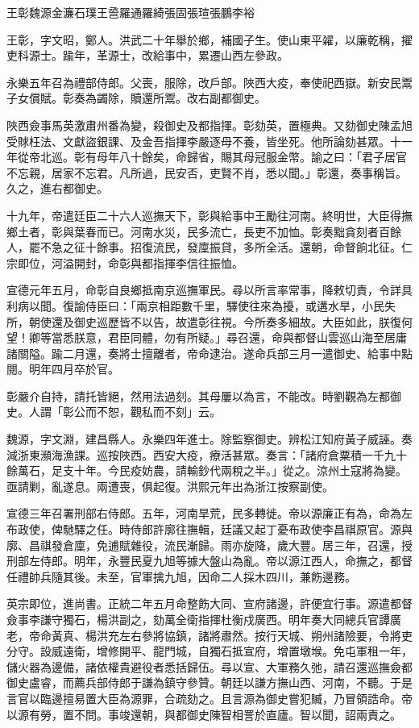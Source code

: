 
\begin{pinyinscope}
王彰魏源金濂石璞王巹羅通羅綺張固張瑄張鵬李裕

王彰，字文昭，鄭人。洪武二十年舉於鄉，補國子生。使山東平糴，以廉乾稱，擢吏科源士。踰年，革源士，改給事中，累遷山西左參政。

永樂五年召為禮部侍郎。父喪，服除，改戶部。陜西大疫，奉使祀西嶽。新安民鬻子女償賦。彰奏為蠲除，贖還所鬻。改右副都御史。

陜西僉事馬英激肅州番為變，殺御史及都指揮。彰劾英，置極典。又劾御史陳孟旭受賕枉法、文獻盜銀課、及金吾指揮李嚴逐母不養，皆坐死。他所論劾甚眾。十一年從帝北巡。彰有母年八十餘矣，命歸省，賜其母冠服金幣。諭之曰：「君子居官不忘親，居家不忘君。凡所過，民安否，吏賢不肖，悉以聞。」彰還，奏事稱旨。久之，進右都御史。

十九年，帝遣廷臣二十六人巡撫天下，彰與給事中王勵往河南。終明世，大臣得撫鄉土者，彰與葉春而已。河南水災，民多流亡，長吏不加恤。彰奏黜貪刻者百餘人，罷不急之征十餘事。招復流民，發廩振貸，多所全活。還朝，命督餉北征。仁宗即位，河溢開封，命彰與都指揮李信往振恤。

宣德元年五月，命彰自良鄉抵南京巡撫軍民。尋以所言率常事，降敕切責，令詳具利病以聞。復諭侍臣曰：「兩京相距數千里，驛使往來為擾，或遘水旱，小民失所，朝使還及御史巡歷皆不以告，故遣彰往視。今所奏多細故。大臣如此，朕復何望！卿等當悉朕意，君臣同體，勿有所疑。」尋召還，命與都督山雲巡山海至居庸諸關隘。踰二月還，奏將士擅離者，帝命逮治。遂命兵部三月一遣御史、給事中點閱。明年四月卒於官。

彰嚴介自持，請托皆絕，然用法過刻。其母屢以為言，不能改。時劉觀為左都御史。人謂「彰公而不恕，觀私而不刻」云。

魏源，字文淵，建昌縣人。永樂四年進士。除監察御史。辨松江知府黃子威誣。奏減浙東瀕海漁課。巡按陜西。西安大疫，療活甚眾。奏言：「諸府倉粟積一千九十餘萬石，足支十年。今民疫妨農，請輸鈔代兩稅之半。」從之。涼州土寇將為變。亟請剿，亂遂息。兩遭喪，俱起復。洪熙元年出為浙江按察副使。

宣德三年召署刑部右侍郎。五年，河南旱荒，民多轉徙。帝以源廉正有為，命為左布政使，俾馳驛之任。時侍郎許廓往撫輯，廷議又起丁憂布政使李昌祺原官。源與廓、昌祺發倉廩，免逋賦雜役，流民漸歸。雨亦旋降，歲大豐。居三年，召還，授刑部左侍郎。明年，永豐民夏九旭等據大盤山為亂。帝以源江西人，命撫之，都督任禮帥兵隨其後。未至，官軍擒九旭，因命二人採木四川，兼飭邊務。

英宗即位，進尚書。正統二年五月命整飭大同、宣府諸邊，許便宜行事。源遣都督僉事李謙守獨石，楊洪副之，劾萬全衛指揮杜衡戍廣西。明年奏大同總兵官譚廣老，帝命黃真、楊洪充左右參將協鎮，諸將肅然。按行天城、朔州諸險要，令將吏分守。設威遠衛，增修開平、龍門城，自獨石抵宣府，增置墩堠。免屯軍租一年，儲火器為邊備，諸依權貴避役者悉括歸伍。尋以宣、大軍務久弛，請召還巡撫僉都御史盧睿，而薦兵部侍郎于謙為鎮守參贊。朝廷以謙方撫山西、河南，不聽。于是言官以臨邊擅易置大臣為源罪，合疏劾之。且言源為御史嘗犯贓，乃冒領誥命。帝以源有勞，置不問。事竣還朝，與都御史陳智相詈於直廬。智以聞，詔兩責之。


\end{pinyinscope}
